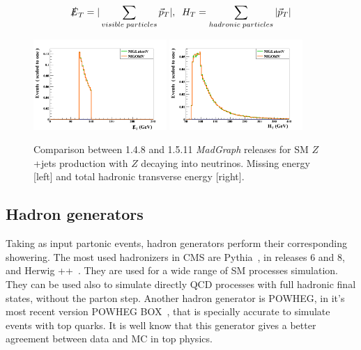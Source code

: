 \begin{equation}
  \label{eq:METHT}
  \slashed{E}_{T}=|\sum_{visible\; particles}\vec{p}_{T}|, \; \; H_{T}=\sum_{hadronic\; particles}|\vec{p}_{T}|
\end{equation}

\begin{figure}[!Hhtbp]
  \begin{center}
    \includegraphics[width=0.45\textwidth]{figs/ZjetsRelVal8.png}
    \includegraphics[width=0.45\textwidth]{figs/ZjetsRelVal9.png}
    \caption{Comparison between 1.4.8 and 1.5.11 \textit{MadGraph} releases for SM $Z$+jets production with $Z$ decaying into neutrinos. Missing energy [left] and total hadronic transverse energy [right].}
    \label{fig:ZRelVal2}
  \end{center}
\end{figure}

\subsection{Hadron generators}
\label{sec:Had}

Taking as input partonic events, hadron generators perform their corresponding showering. The most used hadronizers in CMS are Pythia~\cite{Sjostrand:2006za}, in releases 6 and 8, and Herwig ++~\cite{Bahr:2008pv}. They are used for a wide range of SM processes simulation. They can be used also to simulate directly QCD processes with full hadronic final states, without the parton step. Another hadron generator is POWHEG, in it's most recent version POWHEG BOX~\cite{Nason:2004rx, Frixione:2007vw, Alioli:2010xd}, that is specially accurate to simulate events with top quarks. It is well know that this generator gives a better agreement between data and MC in top physics.

